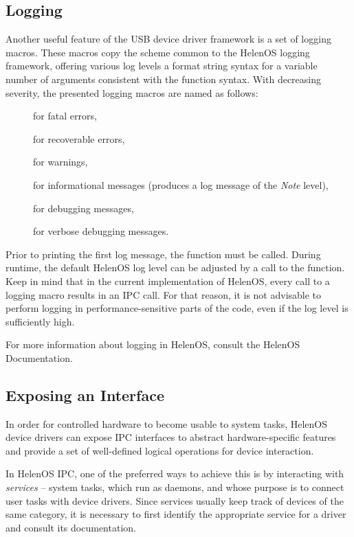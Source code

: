 \subsection{Logging}

Another useful feature of the USB device driver framework is a set of logging
macros. These macros copy the scheme common to the HelenOS logging framework,
offering various log levels a format string syntax for a variable number of
arguments consistent with the  function syntax. With decreasing
severity, the presented logging macros are named as follows:
%
\begin{description}
	\item[] for fatal errors,
	\item[] for recoverable errors,
	\item[] for warnings,
	\item[] for informational messages (produces a log
		message of the \textit{Note} level),
	\item[] for debugging messages,
	\item[] for verbose debugging messages.
\end{description}

Prior to printing the first log message, the  function must be
called. During runtime, the default HelenOS log level can be adjusted by a
call to the  function. Keep in mind that in the
current implementation of HelenOS, every call to a logging macro results in an
IPC call. For that reason, it is not advisable to perform logging in
performance-sensitive parts of the code, even if the log level is sufficiently high.

For more information about logging in HelenOS, consult the HelenOS
Documentation.


\subsection{Exposing an Interface}

In order for controlled hardware to become usable to system tasks, HelenOS
device drivers can expose IPC interfaces to abstract hardware-specific features
and provide a set of well-defined logical operations for device interaction.

In HelenOS IPC, one of the preferred ways to achieve this is by interacting with
\textit{services} -- system tasks, which run as daemons, and whose purpose is to
connect user tasks with device drivers. Since services usually keep track of
devices of the same category, it is necessary to first identify the appropriate
service for a driver and consult its documentation.

